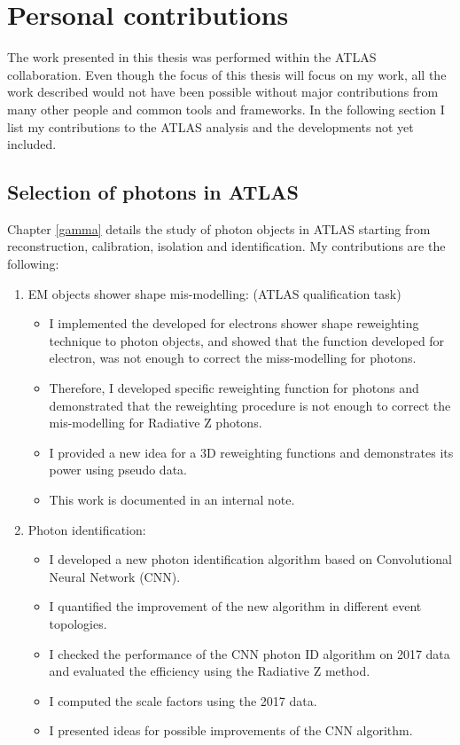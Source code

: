 \newpage
\chapter*{Personal contributions}

The work presented in this thesis was performed within the ATLAS collaboration. Even though the focus of this thesis will focus on my work, all the work described would not have been possible without major contributions from many other people and common tools and frameworks. In the following section I list my contributions to the ATLAS analysis and the developments not yet included. 

\section*{Selection of photons in ATLAS}

Chapter \ref{gamma} details the study of photon objects in ATLAS starting from reconstruction, calibration, isolation and identification. My contributions are the following:

\begin{enumerate}
    \item EM objects shower shape mis-modelling: (ATLAS qualification task) 
\begin{itemize}
    \item I implemented the developed for electrons shower shape reweighting technique to photon objects, and showed that the function developed for electron, was not enough to correct the miss-modelling for photons. 
    \item Therefore, I developed specific reweighting function for photons and demonstrated that the reweighting procedure is not enough to correct the mis-modelling for Radiative Z photons. 
    \item I provided a new idea for a 3D reweighting functions and demonstrates its power using pseudo data.
    \item This work is documented in an internal note.
 
\end{itemize}

\item Photon identification: 
\begin{itemize}
    \item I developed a new photon identification algorithm based on Convolutional Neural Network (CNN).
    \item I quantified the improvement of the new algorithm in different event topologies. 
    \item I checked the performance of the CNN photon ID algorithm on 2017 data and evaluated the efficiency using the Radiative Z method. 
    \item I computed the scale factors using the 2017 data. 
    \item I presented ideas for possible improvements of the CNN algorithm.
\end{itemize}
\end{enumerate}

